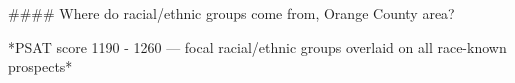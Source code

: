 #### Where do racial/ethnic groups come from, Orange County area?

*PSAT score 1190 - 1260 — focal racial/ethnic groups overlaid on all race-known prospects*
